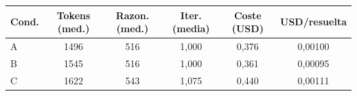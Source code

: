 \begin{tabular}{lccccc}
\toprule
Cond. & Tokens (med.) & Razon. (med.) & Iter. (media) & Coste (USD) & USD/resuelta \\
\midrule
A & 1496 & 516 & 1{,}000 & 0{,}376 & 0{,}00100 \\
B & 1545 & 516 & 1{,}000 & 0{,}361 & 0{,}00095 \\
C & 1622 & 543 & 1{,}075 & 0{,}440 & 0{,}00111 \\
\bottomrule
\end{tabular}

